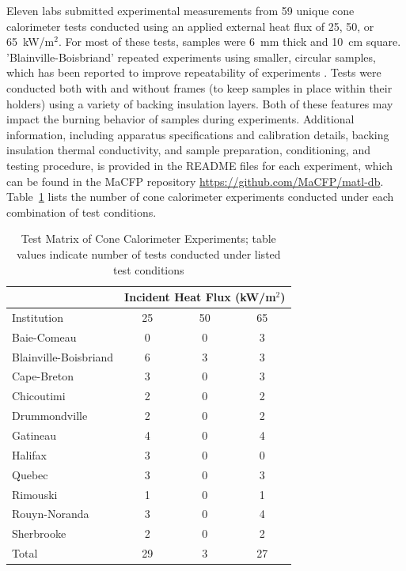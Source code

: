 \documentclass{book}
\begin{document}
Eleven labs submitted experimental measurements from 59 unique cone calorimeter tests conducted using an applied external heat flux of 25, 50, or 65~kW/m$^2$. For most of these tests, samples were 6~mm thick and 10~cm square. 'Blainville-Boisbriand' repeated experiments using smaller, circular samples, which has been reported to improve repeatability of experiments \cite{vermina2019experimental}. Tests were conducted both with and without frames (to keep samples in place within their holders) using a variety of backing insulation layers. Both of these features may impact the burning behavior of samples during experiments. Additional information, including apparatus specifications and calibration details, backing insulation thermal conductivity, and sample preparation, conditioning, and testing procedure, is provided in the README files for each experiment, which can be found in the MaCFP repository \href{https://github.com/MaCFP/matl-db}{https://github.com/MaCFP/matl-db}. Table~\ref{Table_6} lists the number of cone calorimeter experiments conducted under each combination of test conditions.

\begin{table}
\caption{Test Matrix of Cone Calorimeter Experiments; table values indicate number of tests conducted under listed test conditions}
\label{Table_6}
\begin{center}
\begin{tabular}{lccc}
                        & \multicolumn{3}{c}{Incident Heat Flux (kW/m$^2$)} \\ \hline
Institution             & 25 & 50 & 65       \\ \hline
Baie-Comeau             & 0     & 0     & 3  \\
Blainville-Boisbriand   & 6     & 3     & 3  \\
Cape-Breton             & 3     & 0     & 3  \\
Chicoutimi              & 2     & 0     & 2  \\
Drummondville           & 2     & 0     & 2  \\
Gatineau                & 4     & 0     & 4  \\
Halifax                 & 3     & 0     & 0  \\
Quebec                  & 3     & 0     & 3  \\
Rimouski                & 1     & 0     & 1  \\
Rouyn-Noranda           & 3     & 0     & 4  \\
Sherbrooke              & 2     & 0     & 2  \\ \hline
Total                   & 29    & 3     & 27 \\ \hline
\end{tabular}
\end{center}
\end{table}
\end{document}
